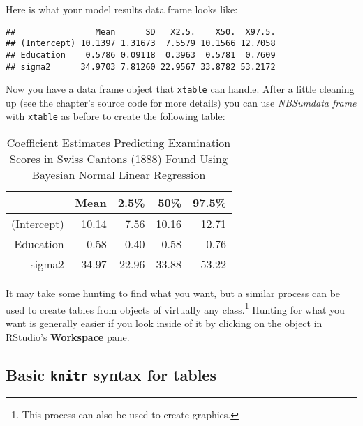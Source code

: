 \noindent Here is what your model results data frame looks like:

\begin{knitrout}
\color{fgcolor}\begin{kframe}
\begin{verbatim}
##                Mean      SD   X2.5.    X50.  X97.5.
## (Intercept) 10.1397 1.31673  7.5579 10.1566 12.7058
## Education    0.5786 0.09118  0.3963  0.5781  0.7609
## sigma2      34.9703 7.81260 22.9567 33.8782 53.2172
\end{verbatim}
\end{kframe}
\end{knitrout}


\noindent Now you have a data frame object that {\tt{xtable}} can handle. After a little cleaning up (see the chapter's source code for more details) you can use {\emph{NBSumdata frame}} with {\tt{xtable}} as before to create the following table:
\vspace{0.5cm}


\begin{table}[ht]
\begin{center}
\begin{tabular}{rrrrr}
  \hline
 & Mean & 2.5\% & 50\% & 97.5\% \\ 
  \hline
(Intercept) & 10.14 & 7.56 & 10.16 & 12.71 \\ 
  Education & 0.58 & 0.40 & 0.58 & 0.76 \\ 
  sigma2 & 34.97 & 22.96 & 33.88 & 53.22 \\ 
   \hline
\end{tabular}
\caption{Coefficient Estimates Predicting Examination Scores in Swiss Cantons (1888) Found Using Bayesian Normal Linear Regression}
\end{center}
\end{table}




It may take some hunting to find what you want, but a similar process can be used to create tables from objects of virtually any class.\footnote{This process can also be used to create graphics.} Hunting for what you want is generally easier if you look inside of it by clicking on the object in RStudio's {\bf{Workspace}} pane.

\subsection{Basic \texttt{knitr} syntax for tables}

